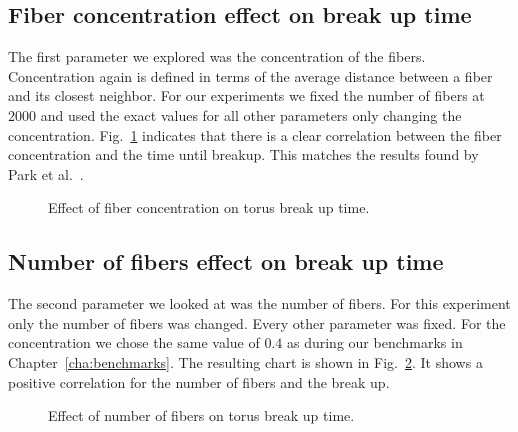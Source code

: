 \subsection{Fiber concentration effect on break up time}

The first parameter we explored was the concentration of the fibers. Concentration again is defined in terms of the average distance between a fiber and its closest neighbor. For our experiments we fixed the number of fibers at $2000$ and used the exact values for all other parameters only changing the concentration. Fig.~\ref{fig:concentration_breakup} indicates that there is a clear correlation between the fiber concentration and the time until breakup. This matches the results found by Park et al.~\cite{Park2010}.

\begin{figure}[!htbp]
  \centering
  \caption{Effect of fiber concentration on torus break up time.}
  \label{fig:concentration_breakup}
\end{figure}

\subsection{Number of fibers effect on break up time}

The second parameter we looked at was the number of fibers. For this experiment only the number of fibers was changed. Every other parameter was fixed. For the concentration we chose the same value of $0.4$ as during our benchmarks in Chapter~\ref{cha:benchmarks}. The resulting chart is shown in Fig.~\ref{fig:number_breakup}. It shows a positive correlation for the number of fibers and the break up.

\begin{figure}[!htbp]
  \centering
  \caption{Effect of number of fibers on torus break up time.}
  \label{fig:number_breakup}
\end{figure}

